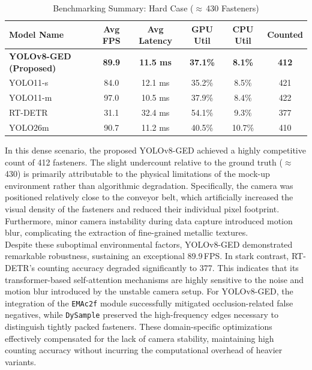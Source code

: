 \begin{table}[htbp]
    \centering
    \caption{Benchmarking Summary: Hard Case ($\approx$\,430 Fasteners)}
    \label{tab:benchmark_hard}
    \begin{tabular}{lccccc}
        \toprule
        \textbf{Model Name} & \textbf{Avg FPS} & \textbf{Avg Latency} & \textbf{GPU Util} & \textbf{CPU Util} & \textbf{Counted} \\
        \midrule
        \textbf{YOLOv8-GED (Proposed)} & \textbf{89.9}  & \textbf{11.5 ms} & \textbf{37.1\%} & \textbf{8.1\%}  & \textbf{412} \\
        YOLO11-s             & 84.0           & 12.1 ms          & 35.2\%          & 8.5\%           & 421          \\
        YOLO11-m             & 97.0           & 10.5 ms          & 37.9\%          & 8.4\%           & 422          \\
        RT-DETR              & 31.1           & 32.4 ms          & 54.1\%          & 9.3\%           & 377          \\
        YOLO26m              & 90.7           & 11.2 ms          & 40.5\%          & 10.7\%          & 410          \\
        \bottomrule
    \end{tabular}
\end{table}

In this dense scenario, the proposed YOLOv8-GED achieved a highly competitive count of 412 fasteners. The slight undercount relative to the ground truth ($\approx$\,430) is primarily attributable to the physical limitations of the mock-up environment rather than algorithmic degradation. Specifically, the camera was positioned relatively close to the conveyor belt, which artificially increased the visual density of the fasteners and reduced their individual pixel footprint. Furthermore, minor camera instability during data capture introduced motion blur, complicating the extraction of fine-grained metallic textures. \\

Despite these suboptimal environmental factors, YOLOv8-GED demonstrated remarkable robustness, sustaining an exceptional 89.9\,FPS. In stark contrast, RT-DETR's counting accuracy degraded significantly to 377. This indicates that its transformer-based self-attention mechanisms are highly sensitive to the noise and motion blur introduced by the unstable camera setup. For YOLOv8-GED, the integration of the \texttt{EMAc2f} module successfully mitigated occlusion-related false negatives, while \texttt{DySample} preserved the high-frequency edges necessary to distinguish tightly packed fasteners. These domain-specific optimizations effectively compensated for the lack of camera stability, maintaining high counting accuracy without incurring the computational overhead of heavier variants.

